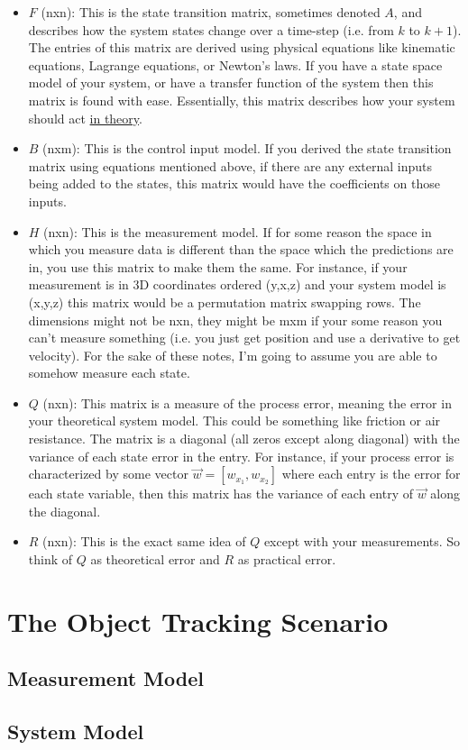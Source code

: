 \documentclass{article} %
\begin{document}
\begin{itemize}
\item $F$ (nxn): This is the state transition matrix, sometimes denoted $A$, and describes how the system states change over a time-step (i.e. from $k$ to $k+1$). The entries of this matrix are derived using physical equations like kinematic equations, Lagrange equations, or Newton's laws. If you have a state space model of your system, or have a transfer function of the system then this matrix is found with ease. Essentially, this matrix describes how your system should act \underline{in theory}.
\item $B$ (nxm): This is the control input model. If you derived the state transition matrix using equations mentioned above, if there are any external inputs being added to the states, this matrix would have the coefficients on those inputs.
\item $H$ (nxn): This is the measurement model. If for some reason the space in which you measure data is different than the space which the predictions are in, you use this matrix to make them the same. For instance, if your measurement is in 3D coordinates ordered (y,x,z) and your system model is (x,y,z) this matrix would be a permutation matrix swapping rows. The dimensions might not be nxn, they might be mxm if your some reason you can't measure something (i.e. you just get position and use a derivative to get velocity). For the sake of these notes, I'm going to assume you are able to somehow measure each state.
\item $Q$ (nxn): This matrix is a measure of the process error, meaning the error in your theoretical system model. This could be something like friction or air resistance. The matrix is a diagonal (all zeros except along diagonal) with the variance of each state error in the entry. For instance, if your process error is characterized by some vector $\vec{w} = [w_{x_1}, w_{x_2}]$ where each entry is the error for each state variable, then this matrix has the variance of each entry of $\vec{w}$ along the diagonal.
\item $R$ (nxn): This is the exact same idea of $Q$ except with your measurements. So think of $Q$ as theoretical error and $R$ as practical error.
\end{itemize}
\section{The Object Tracking Scenario}
\subsection{Measurement Model}
\subsection{System Model}
\end{document}
